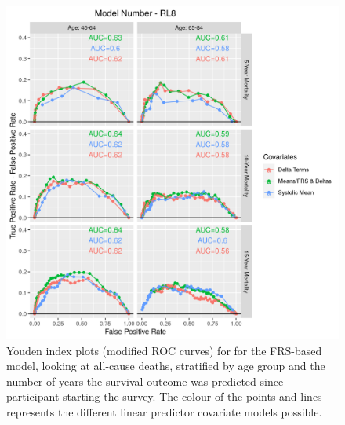 \documentclass[
]{article}
\begin{document}
\begin{figure}
\centering
\includegraphics{./Rmarkdown_Plots/ROC_CAx-Covariates_EventType_RL8.png}
\caption{Youden index plots (modified ROC curves) for for the FRS-based model, looking at all-cause deaths, stratified by age group and the number of years the survival outcome was predicted since participant starting the survey. The colour of the points and lines represents the different linear predictor covariate models possible.}\label{fig:ROC_RL8}
\end{figure}
\end{document}
